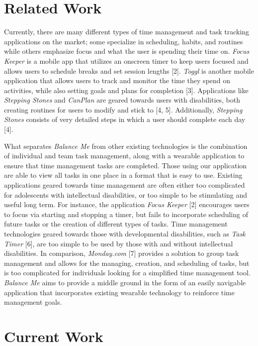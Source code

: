 \documentclass{sigchi}
\begin{document}
\section{Related Work}

Currently, there are many different types of time management and task tracking
applications on the market; some specialize in scheduling, habits, and routines
while others emphasize focus and what the user is spending their time on.
\textit{Focus Keeper} is a mobile app that utilizes an onscreen timer to keep
users focused and allows users to schedule breaks and set session lengths [2].
\textit{Toggl} is another mobile application that allows users to track and
monitor the time they spend on activities, while also setting goals and plans
for completion [3]. Applications like \textit{Stepping Stones} and
\textit{CanPlan} are geared towards users with disabilities, both creating
routines for users to modify and stick to [4, 5]. Additionally,
\textit{Stepping Stones} consists of very detailed steps in which a user should
complete each day [4].

What separates \textit{Balance Me} from other existing technologies is the
combination of individual and team task management, along with a wearable
application to ensure that time management tasks are completed. Those using our
application are able to view all tasks in one place in a format that is easy to
use. Existing applications geared towards time management are often either too
complicated for adolescents with intellectual disabilities, or too simple to be
stimulating and useful long term. For instance, the application
\textit{Focus Keeper} [2] encourages users to focus via starting and stopping a
timer, but fails to incorporate scheduling of future tasks or the creation of
different types of tasks. Time management technologies geared towards those with
developmental disabilities, such as \textit{Task Timer} [6], are too simple to
be used by those with and without intellectual disabilities. In comparison,
\textit{Monday.com} [7] provides a solution to group task management and allows
for the managing, creation, and scheduling of tasks, but is too complicated for
individuals looking for a simplified time management tool. \textit{Balance Me}
aims to provide a middle ground in the form of an easily navigable application
that incorporates existing wearable technology to reinforce time management
goals.

\section{Current Work}
\end{document}
